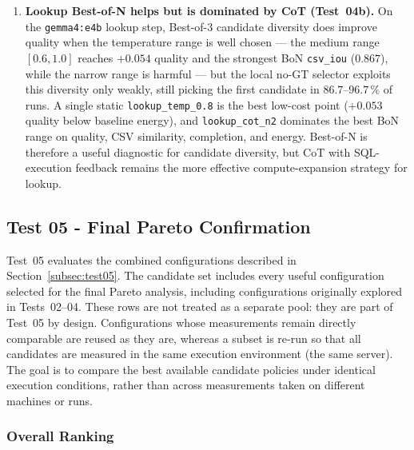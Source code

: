 \begin{enumerate}
    \item \textbf{Lookup Best-of-N helps but is dominated by CoT (Test~04b).}
          On the \texttt{gemma4:e4b} lookup step, Best-of-3 candidate diversity
          does improve quality when the temperature range is well chosen --- the
          medium range $[0.6,1.0]$ reaches $+0.054$ quality and the strongest BoN
          \texttt{csv\_iou} ($0.867$), while the narrow range is harmful --- but
          the local no-GT selector exploits this diversity only weakly, still
          picking the first candidate in $86.7$--$96.7\,\%$ of runs. A single
          static \texttt{lookup\_temp\_0.8} is the best low-cost point ($+0.053$
          quality below baseline energy), and \texttt{lookup\_cot\_n2} dominates
          the best BoN range on quality, CSV similarity, completion, and energy.
          Best-of-N is therefore a useful diagnostic for candidate diversity, but
          CoT with SQL-execution feedback remains the more effective
          compute-expansion strategy for lookup.
\end{enumerate}

\subsection{Test 05 - Final Pareto Confirmation}
\label{subsec:res05}

Test~05 evaluates the combined configurations described in
Section~\ref{subsec:test05}. The candidate set includes every useful
configuration selected for the final Pareto analysis, including configurations
originally explored in Tests~02--04. These rows are not treated as a separate
pool: they are part of Test~05 by design. Configurations whose measurements
remain directly comparable are reused as they are, whereas a subset is re-run
so that all candidates are measured in the same execution environment (the same
server). The goal is to compare the best available candidate policies under
identical execution conditions, rather than across measurements taken on
different machines or runs.

\subsubsection{Overall Ranking}


